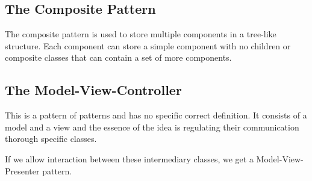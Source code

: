 \documentclass[a4paper, 12pt, twoside]{article}
\begin{document}
\subsection{The Composite Pattern}

The composite pattern is used to store multiple components in a
tree-like structure. Each component can store a simple component
with no children or composite classes that can contain a set of
more components.

\subsection{The Model-View-Controller}

This is a pattern of patterns and has no specific correct definition.
It consists of a model and a view and the essence of the idea is 
regulating their communication thorough specific classes.

\vspace{\baselineskip}

If we allow interaction between these intermediary classes, we get
a Model-View-Presenter pattern. 
\end{document}
